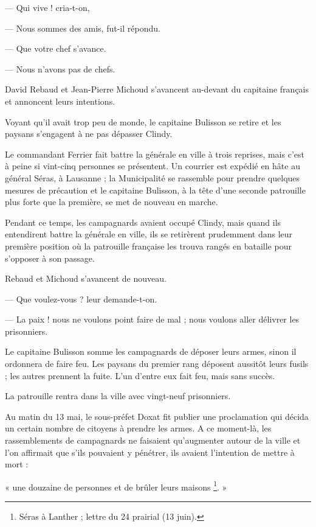 \documentclass[french,twoside]{book} %
\newenvironment{quoteblock}%
  {\begin{quoting}}
  {\end{quoting}}
\newenvironment{quotebar}{%
    \def\FrameCommand{{\color{rubric!10!}\vrule width 0.5em} \hspace{0.9em}}%
    \def\OuterFrameSep{\itemsep} %
    \MakeFramed {\advance\hsize-\width \FrameRestore}
  }%
  {%
    \endMakeFramed
  }
\renewenvironment{quoteblock}%
  {%
    \savenotes
    \setstretch{0.9}
    \begin{quotebar}
  }
  {%
    \end{quotebar}
    \spewnotes
  }
\begin{document}
— Qui vive ! cria-t-on,\par
— Nous sommes des amis, fut-il répondu.\par
— Que votre chef s’avance.\par
— Nous n’avons pas de chefs.\par
David Rebaud et Jean-Pierre Michoud s’avancent au-devant du capitaine français et annoncent leurs intentions.\par
Voyant qu’il avait trop peu de monde, le capitaine Bulisson se retire et les paysans s’engagent à ne pas dépasser Clindy.\par
Le commandant Ferrier fait battre la générale en ville à trois reprises, mais c’est à peine si vint-cinq personnes se présentent. Un courrier est expédié en hâte au général Séras, à Lausanne ; la Municipalité se rassemble pour prendre quelques mesures de précaution et le capitaine Bulisson, à la tête d’une seconde patrouille plus forte que la première, se met de nouveau en marche.\par
Pendant ce temps, les campagnards avaient occupé Clindy, mais quand ils entendirent battre la générale en ville, ils se retirèrent prudemment dans leur première position où la patrouille française les trouva rangés en bataille pour s’opposer à son passage.\par
Rebaud et Michoud s’avancent de nouveau.\par
— Que voulez-vous ? leur demande-t-on.\par
— La paix ! nous ne voulons point faire de mal ; nous voulons aller délivrer les prisonniers.\par
Le capitaine Bulisson somme les campagnards de déposer leurs armes, sinon il ordonnera de faire feu. Les paysans du premier rang déposent aussitôt leurs fusils ; les autres prennent la fuite. L’un d’entre eux fait feu, mais sans succès.\par
La patrouille rentra dans la ville avec vingt-neuf prisonniers.\par
Au matin du 13 mai, le sous-préfet Doxat fit publier une proclamation qui décida un certain nombre de citoyens à prendre les armes. A ce moment-là, les rassemblements de campagnards ne faisaient qu’augmenter autour de la ville et l’on affirmait que s’ils pouvaient y pénétrer, ils avaient l’intention de mettre à mort :\par

\begin{quoteblock}
\noindent « une douzaine de personnes et de brûler leurs maisons \footnote{Séras à Lanther ; lettre du 24 prairial (13 juin).}. »\end{quoteblock}
\end{document}
